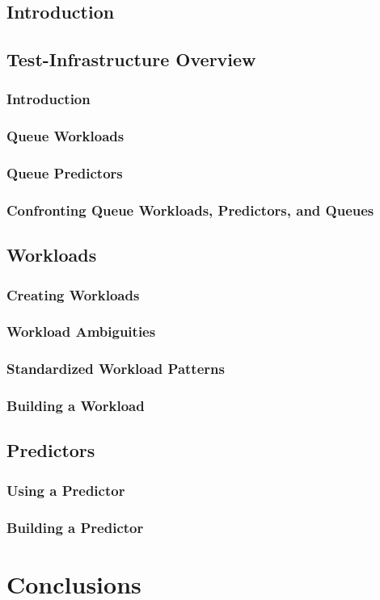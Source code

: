 \documentclass[12pt]{book}
\begin{document}
\section{Introduction}

\section{Test-Infrastructure Overview}

\subsection{Introduction}

\subsection{Queue Workloads}

\subsection{Queue Predictors}

\subsection{Confronting Queue Workloads, Predictors, and Queues}

\section{Workloads}

\subsection{Creating Workloads}

\subsection{Workload Ambiguities}

\subsection{Standardized Workload Patterns}

\subsection{Building a Workload}

\section{Predictors}

\subsection{Using a Predictor}

\subsection{Building a Predictor}

\chapter{Conclusions}
\end{document}
